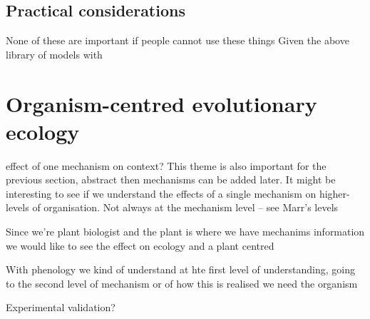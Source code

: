 \documentclass[phd]{infthesis}
\begin{document}



\subsection{Practical considerations}
None of these are important if people cannot use these things
Given the above library of models with 



\section{Organism-centred evolutionary ecology}
effect of one mechanism on context? This theme is also important for the
previous section, abstract then mechanisms can be added later. It might be
interesting to see if we understand the effects of a single mechanism on
higher-levels of organisation.
Not always at the mechanism level -- see Marr's levels

Since we're plant biologist and the plant is where we have mechanims information
we would like to see the effect on ecology and a plant centred

With phenology we kind of understand at hte first level of understanding, going
to the second level of mechanism or of how this is realised we need the organism


Experimental validation?




\printbibliography[heading=bibintoc]
\end{document}
